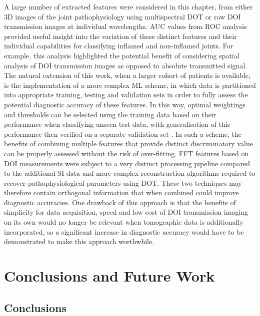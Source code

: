 \documentclass[twoside]{bhamthesis}
\theoremstyle{definition}
\begin{document}
A large number of extracted features were considered in this chapter, from either 3D images of the joint pathophysiology using multispectral DOT or raw DOI transmission images at individual wavelengths. AUC values from ROC analysis provided useful insight into the variation of these distinct features and their individual capabilities for classifying inflamed and non-inflamed joints. For example, this analysis highlighted the potential benefit of considering spatial analysis of DOI transmission images as opposed to absolute transmitted signal. The natural extension of this work, when a larger cohort of patients is available, is the implementation of a more complex ML scheme, in which data is partitioned into appropriate training, testing and validation sets in order to fully assess the potential diagnostic accuracy of these features. In this way, optimal weightings and thresholds can be selected using the training data based on their performance when classifying unseen test data, with generalisation of this performance then verified on a separate validation set \cite{ murphy2012machine}. In such a scheme, the benefits of combining multiple features that provide distinct discriminatory value can be properly assessed without the risk of over-fitting. FFT features based on DOI measurements were subject to a very distinct processing pipeline compared to the additional SI data and more complex reconstruction algorithms required to recover pathophysiological parameters using DOT. These two techniques may therefore contain orthogonal information that when combined could improve diagnostic accuracies. One drawback of this approach is that the benefits of simplicity for data acquisition, speed and low cost of DOI transmission imaging on its own would no longer be relevant when tomographic data is additionally incorporated, so a significant increase in diagnostic accuracy would have to be demonstrated to make this approach worthwhile.

\chapter{Conclusions and Future Work}
\label{Conclusions and Future Work}

\section{Conclusions}
\end{document}
